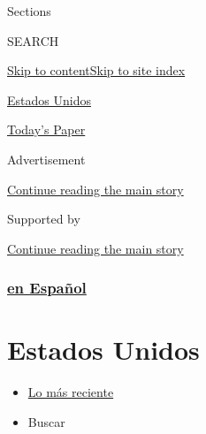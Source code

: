 Sections

SEARCH

\protect\hyperlink{site-content}{Skip to
content}\protect\hyperlink{site-index}{Skip to site index}

\href{https://www.nytimes3xbfgragh.onion/es/section/estados-unidos}{Estados
Unidos}

\href{https://myaccount.nytimes3xbfgragh.onion/auth/login?response_type=cookie\&client_id=vi}{}

\href{https://www.nytimes3xbfgragh.onion/section/todayspaper}{Today's
Paper}

Advertisement

\protect\hyperlink{after-top}{Continue reading the main story}

Supported by

\protect\hyperlink{after-sponsor}{Continue reading the main story}

\hypertarget{en-espauxf1ol}{%
\subsubsection{\texorpdfstring{\href{/es/}{en
Español}}{en Español}}\label{en-espauxf1ol}}

\hypertarget{estados-unidos}{%
\section{Estados Unidos}\label{estados-unidos}}

\begin{itemize}
\tightlist
\item
  \protect\hyperlink{stream-panel}{Lo más reciente}
\item
  Buscar
\end{itemize}

